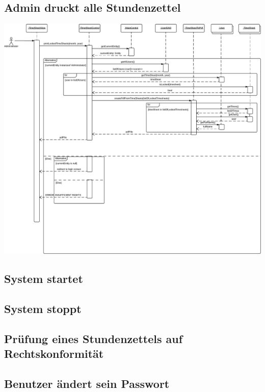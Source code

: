     \newpage
    \subsection{Admin druckt alle Stundenzettel}

        \includegraphics[width=\linewidth]{Diagramms/sequenzes/admin_prints_timesheets.pdf}

    \newpage
    \subsection{System startet}
    \subsection{System stoppt}
    \subsection{Prüfung eines Stundenzettels auf Rechtskonformität}
    \subsection{Benutzer ändert sein Passwort}

\newpage
